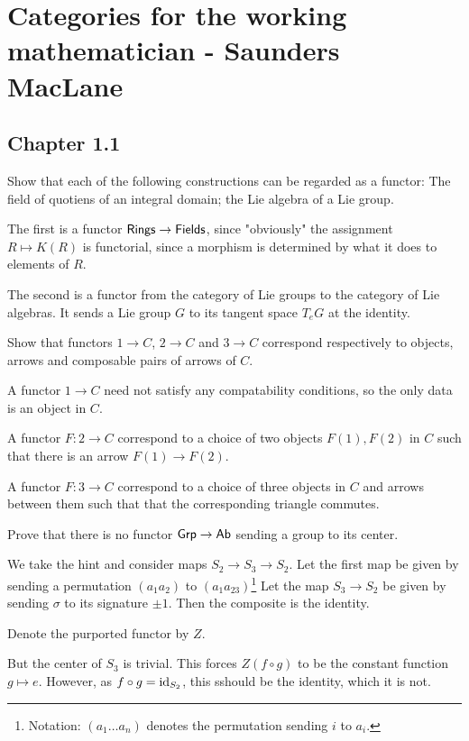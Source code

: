 \documentclass[11pt, english]{article}
\begin{document}
\section{Categories for the working mathematician - Saunders MacLane}
\subsection{Chapter 1.1}

\begin{exc}[1.1]
Show that each of the following constructions can be regarded as a functor: The field of quotiens of an integral domain; the Lie algebra of a Lie group.
\end{exc}
\begin{sol}
The first is a functor $\mathsf{Rings} \to \mathsf{Fields}$, since "obviously" the assignment $R \mapsto K(R)$ is functorial, since a morphism is determined by what it does to elements of $R$.

The second is a functor from the category of Lie groups to the category of Lie algebras. It sends a Lie group $G$ to its tangent space $T_eG$ at the identity.
\end{sol}

\begin{exc}[1.2]
Show that functors $1 \to C$, $2 \to C$ and $3 \to C$ correspond respectively to objects, arrows and composable pairs of arrows of $C$.
\end{exc}
\begin{sol}
A functor $1 \to C$ need not satisfy any compatability conditions, so the only data is an object in $C$.

A functor $F:2 \to C$ correspond to a choice of two objects $F(1),F(2)$ in $C$ such that there is an arrow $F(1) \to F(2)$.

A functor $F:3 \to C$ correspond to a choice of three objects in $C$ and arrows between them such that that the corresponding triangle commutes.
\end{sol}

\begin{exc}[1.4]
Prove that there is no functor $\mathsf{Grp} \to \mathsf{Ab}$ sending a group to its center.
\end{exc}
\begin{sol}
We take the hint and consider maps $S_2 \to S_3 \to S_2$. Let the first map be given by sending a permutation $(a_1a_2)$ to $(a_1a_23)$\footnote{Notation: $(a_1\ldots a_n)$ denotes the permutation sending $i$ to $a_i$.} Let the map $S_3 \to S_2$ be given by sending $\sigma$ to its signature $\pm 1$. Then the composite is the identity.

Denote the purported functor by $Z$.

But the center of $S_3$ is trivial. This forces $Z(f \circ g)$ to be the constant function $g \mapsto e$. However, as $f \circ g=\text{id}_{S_2}$, this sshould be the identity, which it is not.
\end{sol}
\end{document}
